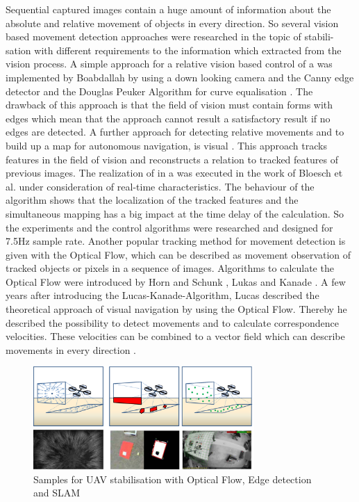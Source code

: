 Sequential captured images contain a huge amount of information about the
absolute and relative movement of objects in every direction. So several vision
based movement detection approaches were researched in the topic of \UAV
stabili- sation with different requirements to the information which extracted
from the vision process. A simple approach for a relative vision based control of
a \UAV was implemented by Boabdallah 
by using a down looking camera and the Canny edge detector  and
the Douglas Peuker Algorithm for curve equalisation . The drawback of this approach is that the field of vision must contain forms with edges which mean that the approach cannot result a satisfactory result if no
edges are detected. A further approach for detecting relative movements and to
build up a map for autonomous navigation, is visual \SLAM. This approach tracks
features in the field of vision and reconstructs a relation to tracked features
of previous images. The realization of \SLAM {} in a \UAV
was executed in the work of Bloesch et al.  under
consideration of real-time characteristics. The behaviour of the algorithm shows
that the localization of the tracked features and the simultaneous mapping has a
big impact at the time delay of the calculation. So the experiments and the
control algorithms were researched and designed for 7.5Hz sample rate. Another
popular tracking method for movement detection is given with the Optical Flow,
which can be described as movement observation of tracked objects or pixels in a
sequence of images. Algorithms to calculate the Optical Flow were introduced by
Horn and Schunk , Lukas and Kanade .
\newpage A few years after introducing the Lucas-Kanade-Algorithm, Lucas
described the theoretical approach of visual navigation by using the Optical Flow. Thereby he
described the possibility to detect movements and to calculate correspondence
velocities. These velocities can be combined to a vector field which can describe
movements in every direction 
.


\begin{figure}[!htbp]
	\centering
		\includegraphics[width=0.75\textwidth]{graphic/VisualApproaches.png}
	\caption{Samples for UAV stabilisation with Optical Flow, Edge detection and SLAM}
	\label{fig:VisualApproaches.png}
\end{figure}

